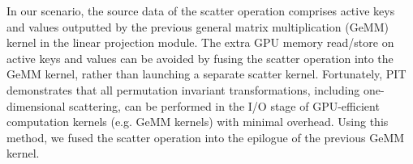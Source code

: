 In our scenario, the source data of the scatter operation comprises active keys and values outputted by the previous general matrix multiplication (GeMM) kernel in the linear projection module. The extra GPU memory read/store on active keys and values can be avoided by fusing the scatter operation into the GeMM kernel, rather than launching a separate scatter kernel. Fortunately, PIT \cite{zheng2023pit} demonstrates that all permutation invariant transformations, including one-dimensional scattering, can be performed in the I/O stage of GPU-efficient computation kernels (e.g. GeMM kernels) with minimal overhead. Using this method, we fused the scatter operation into the epilogue of the previous GeMM kernel.
